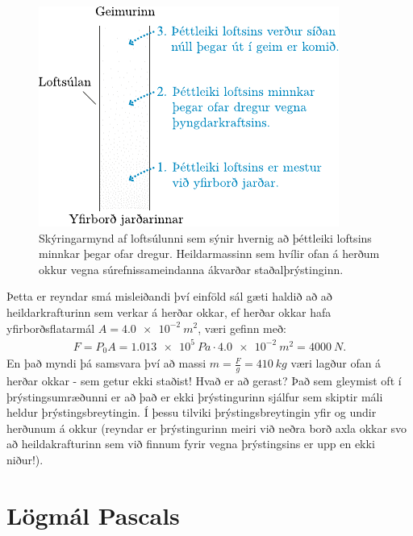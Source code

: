 \begin{figure}[H]
    \centering
    \includegraphics{figures/loftsulan.pdf}
    \caption{Skýringarmynd af loftsúlunni sem sýnir hvernig að þéttleiki loftsins minnkar þegar ofar dregur. Heildarmassinn sem hvílir ofan á herðum okkur vegna súrefnissameindanna ákvarðar staðalþrýstinginn.}
    \label{fig:loftsula}
\end{figure}

Þetta er reyndar smá misleiðandi því einföld sál gæti haldið að að heildarkrafturinn sem verkar á herðar okkar, ef herðar okkar hafa yfirborðsflatarmál $A = \SI{4.0e-2}{m^2}$, væri gefinn með:
\begin{align*}
    F = P_0 A = \SI{1.013e5}{Pa} \cdot \SI{4.0e-2}{m^2} = \SI{4000}{N}.
\end{align*}
En það myndi þá samsvara því að massi $m = \frac{F}{g} = \SI{410}{kg}$ væri lagður ofan á herðar okkar - sem getur ekki staðist! Hvað er að gerast? Það sem gleymist oft í þrýstingsumræðunni er að það er ekki þrýstingurinn sjálfur sem skiptir máli heldur þrýstingsbreytingin. Í þessu tilviki þrýstingsbreytingin yfir og undir herðunum á okkur (reyndar er þrýstingurinn meiri við neðra borð axla okkar svo að heildakrafturinn sem við finnum fyrir vegna þrýstingsins er upp en ekki niður!).


\newpage

\section{Lögmál Pascals}

